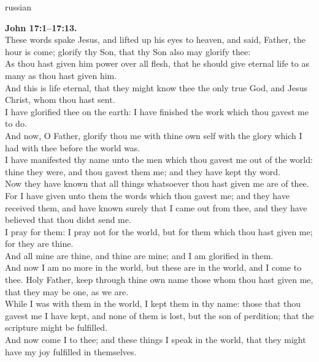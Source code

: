 \documentclass[10pt]{article} %
\begin{document}
{\begin{minipage}[t]{0.45\textwidth}
\begin{otherlanguage*}{russian}
\end{otherlanguage*}
\end{minipage}
\hfill
\begin{minipage}[t]{0.45\textwidth}

\textbf{John 17:1--17:13.}\\
These words spake Jesus, and lifted up his eyes to heaven, and said, Father, the hour is come; glorify thy Son, that thy Son also may glorify thee:\\
As thou hast given him power over all flesh, that he should give eternal life to as many as thou hast given him.\\
And this is life eternal, that they might know thee the only true God, and Jesus Christ, whom thou hast sent.\\
I have glorified thee on the earth: I have finished the work which thou gavest me to do.\\
And now, O Father, glorify thou me with thine own self with the glory which I had with thee before the world was.\\
I have manifested thy name unto the men which thou gavest me out of the world: thine they were, and thou gavest them me; and they have kept thy word.\\
Now they have known that all things whatsoever thou hast given me are of thee.\\
For I have given unto them the words which thou gavest me; and they have received them, and have known surely that I came out from thee, and they have believed that thou didst send me.\\
I pray for them: I pray not for the world, but for them which thou hast given me; for they are thine.\\
And all mine are thine, and thine are mine; and I am glorified in them.\\
And now I am no more in the world, but these are in the world, and I come to thee. Holy Father, keep through thine own name those whom thou hast given me, that they may be one, as we are.\\
While I was with them in the world, I kept them in thy name: those that thou gavest me I have kept, and none of them is lost, but the son of perdition; that the scripture might be fulfilled.\\
And now come I to thee; and these things I speak in the world, that they might have my joy fulfilled in themselves.\\

\end{minipage}}
\end{document}
